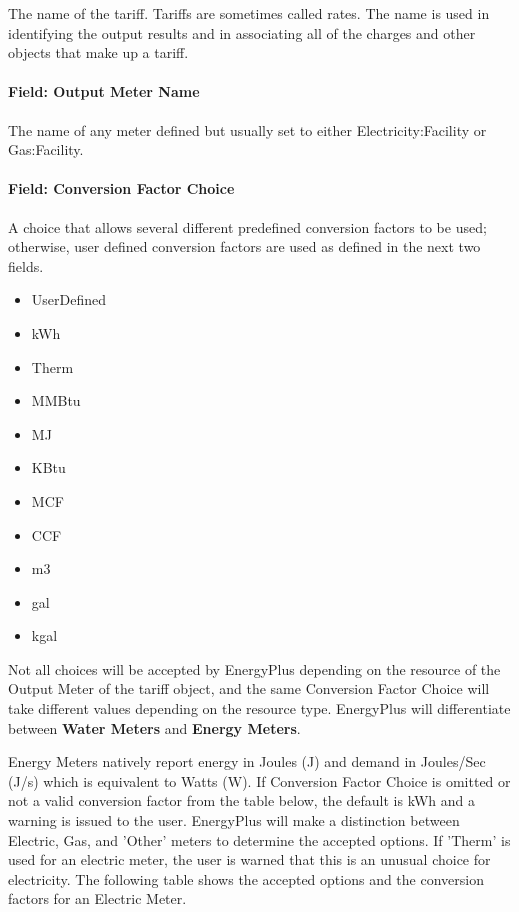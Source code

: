The name of the tariff. Tariffs are sometimes called rates. The name is used in identifying the output results and in associating all of the charges and other objects that make up a tariff.

\paragraph{Field: Output Meter Name}\label{field-output-meter-name}

The name of any meter defined but usually set to either Electricity:Facility or Gas:Facility.

\paragraph{Field: Conversion Factor Choice}\label{field-conversion-factor-choice}

A choice that allows several different predefined conversion factors to be used; otherwise, user defined conversion factors are used as defined in the next two fields.

\begin{itemize}
\item
  UserDefined
\item
  kWh
\item
  Therm
\item
  MMBtu
\item
  MJ
\item
  KBtu
\item
  MCF
\item
  CCF
\item
  m3
\item
  gal
\item
  kgal
\end{itemize}

Not all choices will be accepted by EnergyPlus depending on the resource of the Output Meter of the tariff object, and the same Conversion Factor Choice will take different values depending on the resource type. EnergyPlus will differentiate between \textbf{Water Meters} and \textbf{Energy Meters}.

Energy Meters natively report energy in Joules (J) and demand in Joules/Sec (J/s) which is equivalent to Watts (W).  
If Conversion Factor Choice is omitted or not a valid conversion factor from the table below, the default is kWh and a warning is issued to the user.
EnergyPlus will make a distinction between Electric, Gas, and 'Other' meters to determine the accepted options. If 'Therm' is used for an electric meter, the user is warned that this is an unusual choice for electricity. The following table shows the accepted options and the conversion factors for an Electric Meter.

